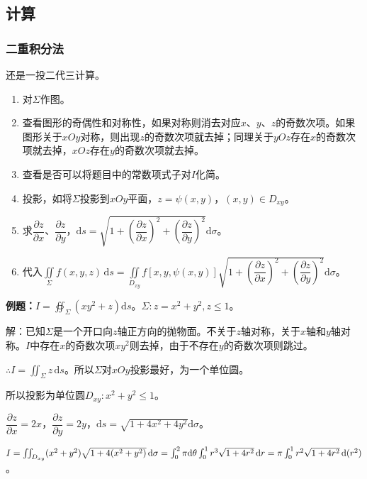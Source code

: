 \subsection{计算}

\subsubsection{二重积分法}

还是一投二代三计算。

\begin{enumerate}
    \item 对$\Sigma$作图。
    \item 查看图形的奇偶性和对称性，如果对称则消去对应$x$、$y$、$z$的奇数次项。如果图形关于$xOy$对称，则出现$z$的奇数次项就去掉；同理关于$yOz$存在$x$的奇数次项就去掉，$xOz$存在$y$的奇数次项就去掉。
    \item 查看是否可以将题目中的常数项式子对$I$化简。
    \item 投影，如将$\Sigma$投影到$xOy$平面，$z=\psi(x,y)$，$(x,y)\in D_{xy}$。
    \item 求$\dfrac{\partial z}{\partial x}$、$\dfrac{\partial z}{\partial y}$，$\textrm{d}s=\sqrt{1+\left(\dfrac{\partial z}{\partial x}\right)^2+\left(\dfrac{\partial z}{\partial y}\right)^2}\textrm{d}\sigma$。
    \item 代入$\displaystyle{\iint\limits_\Sigma f(x,y,z)\,\textrm{d}s=\iint\limits_{D_{xy}}f[x,y,\psi(x,y)]\sqrt{1+\left(\dfrac{\partial z}{\partial x}\right)^2+\left(\dfrac{\partial z}{\partial y}\right)^2}\textrm{d}\sigma}$。
\end{enumerate}

\textbf{例题：}$I=\oiint_\Sigma(xy^2+z)\textrm{d}s$。$\Sigma:z=x^2+y^2,z\leqslant1$。

解：已知$\Sigma$是一个开口向$z$轴正方向的抛物面。不关于$z$轴对称，关于$x$轴和$y$轴对称。$I$中存在$x$的奇数次项$xy^2$则去掉，由于不存在$y$的奇数次项则跳过。

$\therefore I=\iint_\Sigma z\,\textrm{d}s$。所以$\Sigma$对$xOy$投影最好，为一个单位圆。

所以投影为单位圆$D_{xy}:x^2+y^2\leqslant1$。

$\dfrac{\partial z}{\partial x}=2x$，$\dfrac{\partial z}{\partial y}=2y$，$\textrm{d}s=\sqrt{1+4x^2+4y^2}\textrm{d}\sigma$。

$I=\iint_{D_{xy}}(x^2+y^2)\sqrt{1+4(x^2+y^2)}\,\textrm{d}\sigma=\int_0^2\pi\textrm{d}\theta\int_0^1r^3\sqrt{1+4r^2}\,\textrm{d}r=\\\pi\int_0^1r^2\sqrt{1+4r^2}\,\textrm{d}(r^2)$。

